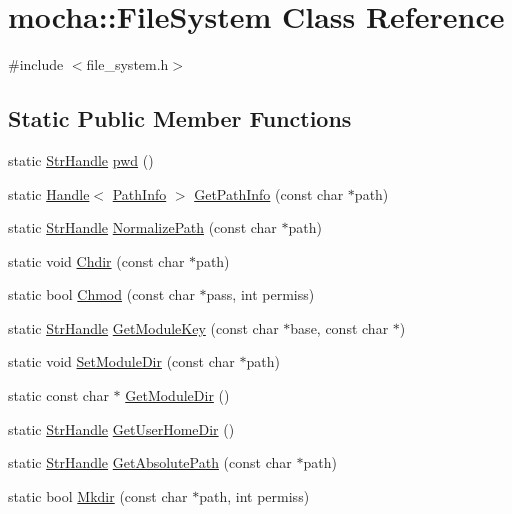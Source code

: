 \hypertarget{classmocha_1_1_file_system}{
\section{mocha::FileSystem Class Reference}
\label{classmocha_1_1_file_system}
}


{\ttfamily \#include $<$file\_\-system.h$>$}

\subsection*{Static Public Member Functions}
\begin{DoxyCompactItemize}
\item 
static \hyperlink{classmocha_1_1_array_handle}{StrHandle} \hyperlink{classmocha_1_1_file_system_afdc88698fd2bfd0b3dc97de20c06cf48}{pwd} ()
\item 
static \hyperlink{classmocha_1_1_handle}{Handle}$<$ \hyperlink{classmocha_1_1_path_info}{PathInfo} $>$ \hyperlink{classmocha_1_1_file_system_ab56ef869ef3f7eab8768c1bc95869c81}{GetPathInfo} (const char $\ast$path)
\item 
static \hyperlink{classmocha_1_1_array_handle}{StrHandle} \hyperlink{classmocha_1_1_file_system_aa8e0d580f05cc70418dd87b93106d619}{NormalizePath} (const char $\ast$path)
\item 
static void \hyperlink{classmocha_1_1_file_system_a23801304e4ec18fddf88b6b6688c0a28}{Chdir} (const char $\ast$path)
\item 
static bool \hyperlink{classmocha_1_1_file_system_aa39867ad9a341dc0c7bd3636203d6e34}{Chmod} (const char $\ast$pass, int permiss)
\item 
static \hyperlink{classmocha_1_1_array_handle}{StrHandle} \hyperlink{classmocha_1_1_file_system_a65191296d1bb00548a66cf5ba7426594}{GetModuleKey} (const char $\ast$base, const char $\ast$)
\item 
static void \hyperlink{classmocha_1_1_file_system_af69da9f81d9effd19ceb8736d8450bd7}{SetModuleDir} (const char $\ast$path)
\item 
static const char $\ast$ \hyperlink{classmocha_1_1_file_system_aadad83aa0066e57ea4fa785b10026bc3}{GetModuleDir} ()
\item 
static \hyperlink{classmocha_1_1_array_handle}{StrHandle} \hyperlink{classmocha_1_1_file_system_a0dff04800995e60c7ea2bc5428c0288d}{GetUserHomeDir} ()
\item 
static \hyperlink{classmocha_1_1_array_handle}{StrHandle} \hyperlink{classmocha_1_1_file_system_ad09942b93a267933166cdadba349397f}{GetAbsolutePath} (const char $\ast$path)
\item 
static bool \hyperlink{classmocha_1_1_file_system_a0c202c7a85c8827f4ffac7bff746c7a8}{Mkdir} (const char $\ast$path, int permiss)
\end{DoxyCompactItemize}
